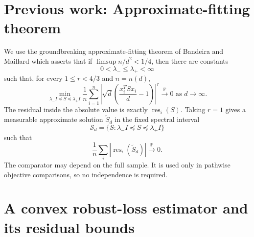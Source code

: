 \documentclass[11pt]{article}
\numberwithin{equation}{section}
\theoremstyle{definition}
\theoremstyle{remark}
\newcommand{\Pp}{\mathbb P}
\newcommand{\1}{\boldsymbol 1}
\newcommand{\res}{\operatorname{res}}
\newcommand{\rentry}[1]{\res_{#1}}
\begin{document}
\section{Previous work: Approximate-fitting
theorem}\label{the-published-approximate-comparator}
\begin{humanblock}

    


We use the groundbreaking approximate-fitting
theorem of Bandeira and Maillard
\cite[Theorem 1.4]{BandeiraMaillard2025}  which asserts that if
$\limsup n/d^2<1/4$, then there are constants
\[
  0<\lambda_-\le\lambda_+<\infty
\]
such that, for every $1\le r<4/3$ and $n=n(d)$,
\[
  \min_{\lambda_-I\preceq S\preceq\lambda_+I}
  \frac1n\sum_{i=1}^n
  \left|\sqrt d\left(\frac{x_i^TSx_i}{d}-1\right)
  \right|^r\xrightarrow{\Pp}0 \text{ as $d \to\infty$.}
\]
The residual inside the absolute value is exactly
$\rentry{i}(S)$. Taking $r=1$ gives a measurable
approximate solution $\widetilde S_d$ in the fixed
spectral interval
\[
  \mathcal S_d=
  \{S:\lambda_-I\preceq S\preceq\lambda_+I\}
\]
such that
\[
  \frac1n\sum_i|\rentry{i}(\widetilde S_d)|
  \xrightarrow{\Pp}0.
\]
The comparator may depend on the full sample. It
is used only in pathwise objective comparisons,
so no independence is required.

\end{humanblock}

\section{A convex robust-loss estimator and its
residual bounds}\label{the-huber-selector-and-its-residual-energy}
\end{document}
